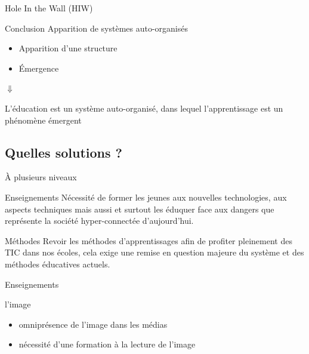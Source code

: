 \begin{frame}{Hole In the Wall (HIW)}
  \begin{block}{Conclusion}
    Apparition de systèmes auto-organisés
    \begin{itemize}
      \item Apparition d'une structure
      \item Émergence
    \end{itemize}
    \pause
    \begin{center}
      $\Downarrow$
      
     \begin{coolquote}
      L'éducation est un système auto-organisé, dans lequel l'apprentissage est un phénomène émergent
    \end{coolquote}
    \end{center}
  \end{block}
\end{frame}

\subsection{Quelles solutions ?}

\begin{frame}{À plusieurs niveaux}
\begin{block}{Enseignements}
Nécessité de former les jeunes aux nouvelles technologies, aux aspects techniques mais aussi et surtout les éduquer face aux dangers que représente la société hyper-connectée d'aujourd'hui.
\end{block}
\begin{block}{Méthodes}
Revoir les méthodes d'apprentissages afin de profiter pleinement des TIC dans nos écoles, cela exige une remise en question majeure du système et des méthodes éducatives actuels.
\end{block}
\end{frame}


\begin{frame}{Enseignements}
  \begin{block}{l'image}
    \begin{itemize}
      \item omniprésence de l'image dans les médias
      \item nécessité d'une formation à la lecture de l'image
    \end{itemize}
  \end{block}
\end{frame}
  
